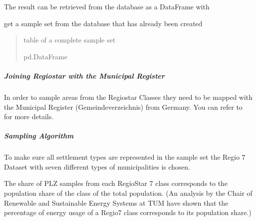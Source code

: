 \documentclass[letterpaper,10pt,english]{sphinxmanual}
\let\sphinxpxdimen\pdfpxdimen\else\newdimen\sphinxpxdimen
\begin{document}
\sphinxAtStartPar
The result can be retrieved from the database as a DataFrame with

\begin{fulllineitems}
\label{\detokenize{classification/classification_steps/sampling:classification.sampling.sample.get_sample_set}}
\pysigstartsignatures
{}
\pysigstopsignatures
\sphinxAtStartPar
get a sample set from the database that has already been created
\begin{quote}\begin{description}
\sphinxAtStartPar
table of a complete sample set

\sphinxAtStartPar
pd.DataFrame

\end{description}\end{quote}

\end{fulllineitems}



\subparagraph{Joining Regiostar with the Municipal Register}
\label{\detokenize{classification/classification_steps/sampling:joining-regiostar-with-the-municipal-register}}
\sphinxAtStartPar
In order to sample areas from the Regiostar Classes they need to be mapped with the Municipal Register
(Gemeindeverzeichnis) from Germany. You can refer to {\hyperref[\detokenize{docs_pylovo/municipal_register/municipal_register::doc}]{}}
for more details.


\subparagraph{Sampling Algorithm}
\label{\detokenize{classification/classification_steps/sampling:sampling-algorithm}}
\sphinxAtStartPar
To make sure all settlement types are represented in the sample set the Regio 7 Dataset with seven different types of
municipalities is chosen.

\noindent\sphinxincludegraphics[width=600\sphinxpxdimen]{{regiostar}.png}

\sphinxAtStartPar
The share of PLZ samples from each RegioStar 7 class corresponds to the  population share of the class of the total
population. (An analysis by the Chair of Renewable and
Sustainable Energy Systems at TUM have shown that the percentage of energy usage of a Regio7 class corresponds to its
population share.)
\end{document}
